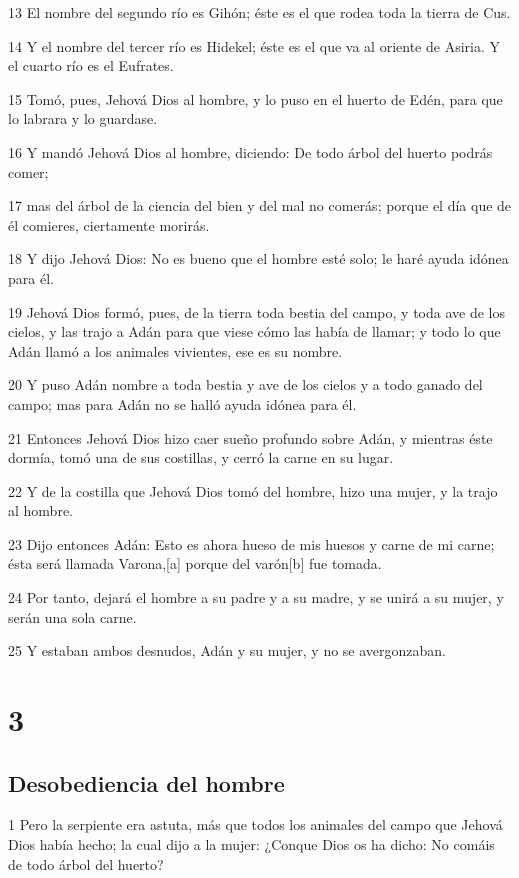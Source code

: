 13 El nombre del segundo río es Gihón; éste es el que rodea toda la tierra de Cus.

14 Y el nombre del tercer río es Hidekel; éste es el que va al oriente de Asiria. Y el cuarto río es el Eufrates.

15 Tomó, pues, Jehová Dios al hombre, y lo puso en el huerto de Edén, para que lo labrara y lo guardase.

16 Y mandó Jehová Dios al hombre, diciendo: De todo árbol del huerto podrás comer;

17 mas del árbol de la ciencia del bien y del mal no comerás; porque el día que de él comieres, ciertamente morirás.

18 Y dijo Jehová Dios: No es bueno que el hombre esté solo; le haré ayuda idónea para él.

19 Jehová Dios formó, pues, de la tierra toda bestia del campo, y toda ave de los cielos, y las trajo a Adán para que viese cómo las había de llamar; y todo lo que Adán llamó a los animales vivientes, ese es su nombre.

20 Y puso Adán nombre a toda bestia y ave de los cielos y a todo ganado del campo; mas para Adán no se halló ayuda idónea para él.

21 Entonces Jehová Dios hizo caer sueño profundo sobre Adán, y mientras éste dormía, tomó una de sus costillas, y cerró la carne en su lugar.

22 Y de la costilla que Jehová Dios tomó del hombre, hizo una mujer, y la trajo al hombre.

23 Dijo entonces Adán: Esto es ahora hueso de mis huesos y carne de mi carne; ésta será llamada Varona,[a] porque del varón[b] fue tomada.

24 Por tanto, dejará el hombre a su padre y a su madre, y se unirá a su mujer, y serán una sola carne.

25 Y estaban ambos desnudos, Adán y su mujer, y no se avergonzaban.

\chapter{3}

\section{Desobediencia del hombre}

1 Pero la serpiente era astuta, más que todos los animales del campo que Jehová Dios había hecho; la cual dijo a la mujer: ¿Conque Dios os ha dicho: No comáis de todo árbol del huerto?

